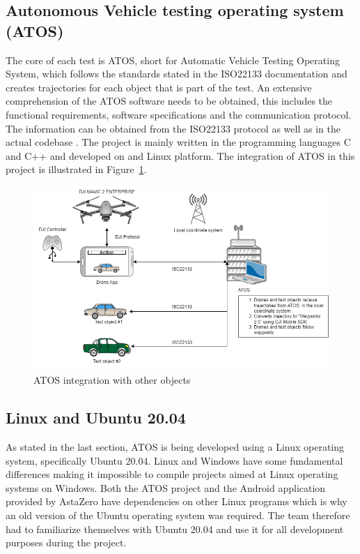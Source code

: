 \subsection{Autonomous Vehicle testing operating system (ATOS)} \label{ATOS}
The core of each test is ATOS, short for Automatic Vehicle Testing Operating System, which follows the standards stated in the ISO22133 documentation and creates trajectories for each object that is part of the test. An extensive comprehension of the ATOS software needs to be obtained, this includes the functional requirements, software specifications and the communication protocol. The information can be obtained from the ISO22133 protocol  as well as in the actual codebase \cite{AstaZero2023ATOS:Systems.}. The project is mainly written in the programming languages C and C++ and developed on and Linux platform. The integration of ATOS in this project is illustrated in Figure~\ref{fig:ATOS-flow}.
\begin{figure}[H]
  \centering
  \includegraphics[width=\columnwidth]{figure/flow_config.png}
  \caption{ATOS integration with other objects}
  \label{fig:ATOS-flow}
\end{figure}




\subsection{Linux and Ubuntu 20.04} \label{Linux}
As stated in the last section, ATOS is being developed using a Linux operating system, specifically Ubuntu 20.04. Linux and Windows have some fundamental differences making it impossible to compile projects aimed at Linux operating systems on Windows. Both the ATOS project and the Android application provided by AstaZero have dependencies on other Linux programs which is why an old version of the Ubuntu operating system was required. The team therefore had to familiarize themselves with Ubuntu 20.04 and use it for all development purposes during the project. 

